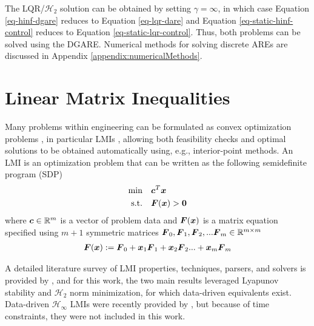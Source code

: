 The LQR/$\mathcal{H}_{2}$ solution can be obtained by setting $\gamma = \infty$, in which case Equation \eqref{eq-hinf-dgare} reduces to Equation \eqref{eq-lqr-dare} and Equation \eqref{eq-static-hinf-control} reduces to Equation \eqref{eq-static-lqr-control}.  Thus, both problems can be solved using the DGARE.  Numerical methods for solving discrete AREs are discussed in Appendix \ref{appendix:numericalMethods}.

\section{Linear Matrix Inequalities}
Many problems within engineering can be formulated as convex optimization problems \cite{boyd1990linear, boyd1994linear, balakrishnan1995connections, skogestad2005multivariable, liu2017survey}, in particular LMIs \cite{caverly2019lmi}, allowing both feasibility checks and optimal solutions to be obtained automatically using, e.g., interior-point methods.  An LMI is an optimization problem that can be written as the following semidefinite program (SDP)
\begin{equation}
\label{eq-generic-sdp}
\begin{aligned}
	\min \quad & \vb*{c}^{T}\vb*{x}\\
	\textrm{s.t.} \quad & \vb*{F}(\vb*{x}) > \vb*{0}\\
\end{aligned}
\end{equation}
where $\vb*{c} \in \mathbb{R}^{m}$ is a vector of problem data and $\vb*{F}(\vb*{x})$ is a matrix equation specified using $m+1$ symmetric matrices $\vb*{F}_{0}, \vb*{F}_{1}, \vb*{F}_{2}, ... \vb*{F}_{m} \in \mathbb{R}^{m \times m}$
\begin{equation}
\begin{aligned}
	\vb*{F}(\vb*{x}) := \vb*{F}_{0} + \vb*{x}_{1}\vb*{F}_{1} + \vb*{x}_{2}\vb*{F}_{2} ... + \vb*{x}_{m}\vb*{F}_{m}
\end{aligned}
\end{equation}

A detailed literature survey of LMI properties, techniques, parsers, and solvers is provided by \cite{caverly2019lmi}, and for this work, the two main results leveraged Lyapunov stability and $\mathcal{H}_{2}$ norm minimization, for which data-driven equivalents exist.  Data-driven $\mathcal{H}_{\infty}$ LMIs were recently provided by \cite{berberich2020robust, berberich2022combining}, but because of time constraints, they were not included in this work.

